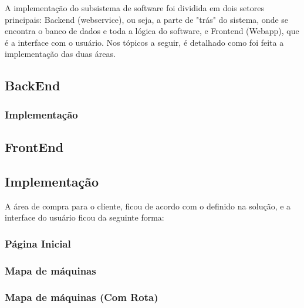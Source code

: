 A implementação do subsistema de software foi dividida em dois setores principais: Backend (webservice), ou seja, a parte de "trás" do sistema, onde se encontra o banco de dados e toda a lógica do software, e Frontend (Webapp), que é a interface com o usuário. Nos tópicos a seguir, é detalhado como foi feita a implementação das duas áreas.

\subsection{BackEnd}
\subsubsection{Implementação}

\subsection{FrontEnd}
\subsection{Implementação}

A área de compra para o cliente, ficou de acordo com o definido na solução, e a interface do usuário ficou da seguinte forma:

\subsubsection{Página Inicial}


\subsubsection{Mapa de máquinas}



\subsubsection{Mapa de máquinas (Com Rota)}


